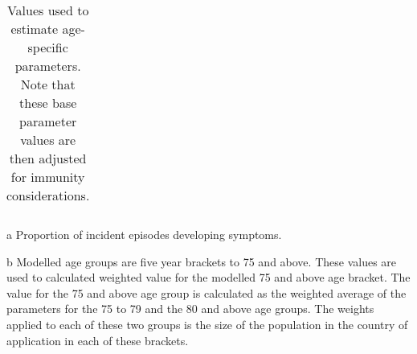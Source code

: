 \begin{table}
\begin{threeparttable}
\begin{tabularx}{\textwidth}{| X | X | X | X | X |}
        \hline
	\end{tabularx}
	\caption{Values used to estimate age-specific parameters.
    Note that these base parameter values are then adjusted for immunity considerations.}
	\label{tab:age_params}
    \begin{tablenotes}
        \item[a] Proportion of incident episodes developing symptoms.
        \item[b] Modelled age groups are five year brackets to 75 and above.
        These values are used to calculated weighted value for the modelled 75 and above age bracket.
        The value for the 75 and above age group is calculated as the weighted average of the parameters for the 75 to 79 and the 80 and above age groups.
        The weights applied to each of these two groups is the size of the population in the country of application in each of these brackets.
    \end{tablenotes}
    \end{threeparttable}
\end{table}

